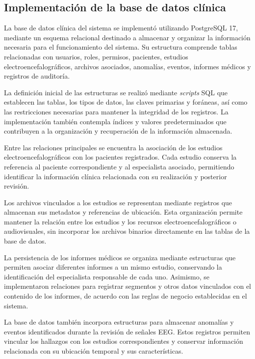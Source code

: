 \subsection{Implementación de la base de datos clínica}

La base de datos clínica del sistema se implementó utilizando
PostgreSQL 17, mediante un esquema relacional destinado a
almacenar y organizar la información necesaria para el
funcionamiento del sistema. Su estructura comprende tablas
relacionadas con usuarios, roles, permisos, pacientes,
estudios electroencefalográficos, archivos asociados,
anomalías, eventos, informes médicos y registros de
auditoría.

La definición inicial de las estructuras se realizó
mediante \textit{scripts} SQL que establecen las tablas, los tipos
de datos, las claves primarias y foráneas, así como las
restricciones necesarias para mantener la integridad de
los registros. La implementación también contempla
índices y valores predeterminados que contribuyen a la
organización y recuperación de la información almacenada.

Entre las relaciones principales se encuentra la
asociación de los estudios electroencefalográficos
con los pacientes registrados. Cada estudio conserva
la referencia al paciente correspondiente y al
especialista asociado, permitiendo identificar la
información clínica relacionada con su realización
y posterior revisión.

Los archivos vinculados a los estudios se representan
mediante registros que almacenan sus metadatos y
referencias de ubicación. Esta organización permite
mantener la relación entre los estudios y los recursos
electroencefalográficos o audiovisuales, sin incorporar
los archivos binarios directamente en las tablas de
la base de datos.

La persistencia de los informes médicos se organiza
mediante estructuras que permiten asociar diferentes
informes a un mismo estudio, conservando la identificación
del especialista responsable de cada uno. Asimismo,
se implementaron relaciones para registrar segmentos
y otros datos vinculados con el contenido de los
informes, de acuerdo con las reglas de negocio
establecidas en el sistema.

La base de datos también incorpora estructuras para
almacenar anomalías y eventos identificados durante
la revisión de señales EEG. Estos registros permiten
vincular los hallazgos con los estudios correspondientes
y conservar información relacionada con su ubicación
temporal y sus características.

